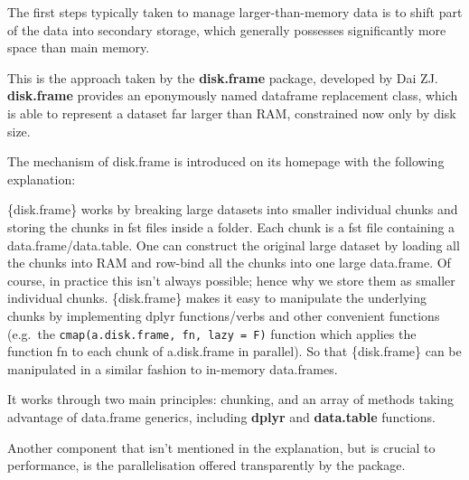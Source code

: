 The first steps typically taken to manage larger-than-memory data is to
shift part of the data into secondary storage, which generally possesses
significantly more space than main memory.

This is the approach taken by the \textbf{disk.frame} package, developed
by Dai ZJ. \textbf{disk.frame} provides an eponymously named dataframe
replacement class, which is able to represent a dataset far larger than
RAM, constrained now only by disk size\cite{zj20}.

The mechanism of disk.frame is introduced on its homepage with the
following explanation:

\begin{displayquote}
	\{disk.frame\} works by breaking large datasets into smaller individual
	chunks and storing the chunks in fst files inside a folder. Each chunk
	is a fst file containing a data.frame/data.table. One can construct the
	original large dataset by loading all the chunks into RAM and row-bind
	all the chunks into one large data.frame. Of course, in practice this
	isn't always possible; hence why we store them as smaller individual
	chunks. \{disk.frame\} makes it easy to manipulate the underlying chunks
	by implementing dplyr functions/verbs and other convenient functions
	(e.g.~the \texttt{cmap(a.disk.frame, fn, lazy = F)}
	function which applies the function fn to each chunk of a.disk.frame in
	parallel). So that \{disk.frame\} can be manipulated in a similar
	fashion to in-memory data.frames.
\end{displayquote}

It works through two main principles: chunking, and an array of methods
taking advantage of data.frame generics, including \textbf{dplyr} and
\textbf{data.table} functions.

Another component that isn't mentioned in the explanation, but is
crucial to performance, is the parallelisation offered transparently by
the package.

